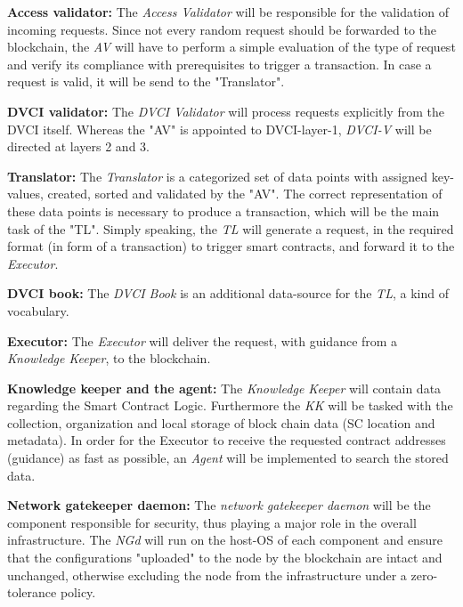 \documentclass[]{article}
\begin{document}
\textbf{Access validator:}
The \textit{Access Validator} will be responsible for the validation of incoming requests. 
Since not every random request should be forwarded to the blockchain, the \textit{AV} will have to perform a simple evaluation of the type of request and verify its compliance with prerequisites to trigger a transaction. 
In case a request is valid, it will be send to the "Translator".  
\newline

\textbf{DVCI validator:}
The \textit{DVCI Validator} will process requests explicitly from the DVCI itself. 
Whereas the "AV" is appointed to DVCI-layer-1, \textit{DVCI-V} will be directed at layers 2 and 3.    
\newline

\textbf{Translator:}
The \textit{Translator} is a categorized set of data points with assigned key-values, created, sorted and validated by the "AV". 
The correct representation of these data points is necessary to produce a transaction, which will be the main task of the "TL". 
Simply speaking, the \textit{TL} will generate a request, in the required format (in form of a transaction) to trigger smart contracts, and forward it to the \textit{Executor}.   
\newline

\textbf{DVCI book:}
The \textit{DVCI Book} is an additional data-source for the \textit{TL}, a kind of vocabulary. 
\newline

\textbf{Executor:}
The \textit{Executor} will deliver the request, with guidance from a \textit{Knowledge Keeper}, to the blockchain.   
\newline

\textbf{Knowledge keeper and the agent:}
The \textit{Knowledge Keeper} will contain data regarding the Smart Contract Logic. 
Furthermore the \textit{KK} will be tasked with the collection, organization and local storage of block chain data (SC location and metadata). 
In order for the Executor to receive the requested contract addresses (guidance) as fast as possible, an \textit{Agent} will be implemented to search the stored data.  
\newline

\textbf{Network gatekeeper daemon:}
The \textit{network gatekeeper daemon} will be the component responsible for security, thus playing a major role in the overall infrastructure. 
The \textit{NGd} will run on the host-OS of each component and ensure that the configurations "uploaded" to the node by the blockchain are intact and unchanged, otherwise excluding the node from the infrastructure under a zero-tolerance policy. 
\newline
\end{document}
